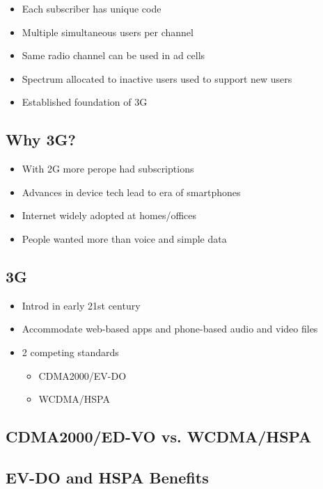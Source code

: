 \begin{itemize}
	\item Each subscriber has unique code
	\item Multiple simultaneous users per channel
	\item Same radio channel can be used in ad cells
	\item Spectrum allocated to inactive users used to support new users
	\item Established foundation of 3G
\end{itemize}

\subsection{Why 3G?}

\begin{itemize}
	\item With 2G more perope had subscriptions
	\item Advances in device tech lead to era of smartphones
	\item Internet widely adopted at homes/offices
	\item People wanted more than voice and simple data
\end{itemize}

\subsection{3G}

\begin{itemize}
	\item Introd in early 21st century
	\item Accommodate web-based apps and phone-based audio and video files
	\item 2 competing standards
	\begin{itemize}
		\item CDMA2000/EV-DO
		\item WCDMA/HSPA
	\end{itemize}
\end{itemize}

\subsection{CDMA2000/ED-VO vs. WCDMA/HSPA}

\subsection{EV-DO and HSPA Benefits}

